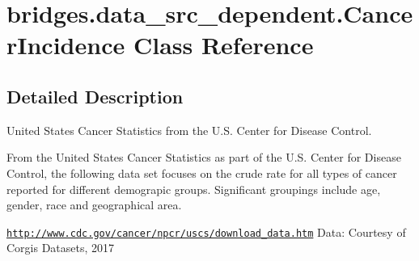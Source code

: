 \hypertarget{classbridges_1_1data__src__dependent_1_1_cancer_incidence}{}\section{bridges.\+data\+\_\+src\+\_\+dependent.\+Cancer\+Incidence Class Reference}
\label{classbridges_1_1data__src__dependent_1_1_cancer_incidence}


\subsection{Detailed Description}
United States Cancer Statistics from the U.\+S. Center for Disease Control. 

From the United States Cancer Statistics as part of the U.\+S. Center for Disease Control, the following data set focuses on the crude rate for all types of cancer reported for different demograpic groups. Significant groupings include age, gender, race and geographical area.

\href{http://www.cdc.gov/cancer/npcr/uscs/download_data.htm}{\tt http\+://www.\+cdc.\+gov/cancer/npcr/uscs/download\+\_\+data.\+htm} Data\+: Courtesy of Corgis Datasets, 2017

